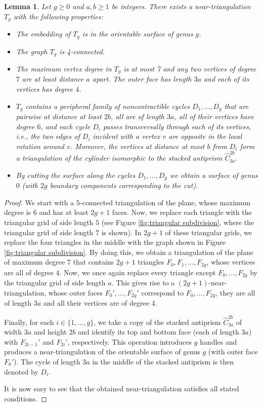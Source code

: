\documentclass[11pt]{article}
\newtheorem{lemma}[theorem]{Lemma}
\begin{document}
\begin{lemma}\label{lem:desired near-triangulation}
Let $g\ge0$ and $a,b\ge1$ be integers. There exists a near-triangulation $T_g$ with the following properties:
  \begin{itemize}
   \item[(1)] The embedding of $T_g$ is in the orientable surface of genus $g$.
   \item[(2)] The graph $T_g$ is 4-connected.
   \item[(3)] The maximum vertex degree in $T_g$ is at most 7 and any two vertices of degree $7$ are at least distance $a$ apart. The outer face has length $3a$ and each of its vertices has degree $4$. 
   \item[(4)] $T_g$ contains a peripheral family of noncontractible cycles $D_1,\dots,D_g$ that are pairwise at distance at least $2b$, all are of length $3a$, all of their vertices have degree $6$, and each cycle $D_i$ passes transversally through each of its vertices, i.e., the two edges of $D_i$ incident with a vertex $v$ are opposite in the local rotation around $v$. Moreover, the vertices at distance at most $b$ from $D_i$ form a triangulation of the cylinder isomorphic to the stacked antiprism $\widehat{C}_{3a}^{2b}$. 
   \item[(5)] By cutting the surface along the cycles $D_1,\dots,D_g$ we obtain a surface of genus $0$ (with $2g$ boundary components corresponding to the cut). 
  \end{itemize}
\end{lemma}

\begin{proof}
  We start with a $5$-connected triangulation of the plane, whose maximum degree is 6 and has at least $2g+1$ faces. Now, we replace each triangle with the triangular grid of side length $5$ (see Figure \ref{fig:triangular subdivision}, where the triangular grid of side length $7$ is shown). In $2g+1$ of these triangular grids, we replace the four triangles in the middle with the graph shown in Figure \ref{fig:triangular subdivision}. By doing this, we obtain a triangulation of the plane of maximum degree 7 that contains $2g+1$ triangles $F_0,F_1,\dots,F_{2g}$, whose vertices are all of degree 4. Now, we once again replace every triangle except $F_0,\dots,F_{2g}$ by the triangular grid of side length $a$. This gives rise to a $(2g+1)$-near-triangulation, whose outer faces $F_0',\dots,F_{2g}'$ correspond to $F_0,\dots,F_{2g}$, they are all of length $3a$ and all their vertices are of degree 4.
  
  Finally, for each $i\in \{1,\dots,g\}$, we take a copy of the stacked antiprism $\widehat{C}_{3a}^{2b}$ of width $3a$ and height $2b$ and identify its top and bottom face (each of length $3a$) with $F_{2i-1}'$ and $F_{2i}'$, respectively. This operation introduces $g$ handles and produces a near-triangulation of the orientable surface of genus $g$ (with outer face $F_0'$). The cycle of length $3a$ in the middle of the stacked antiprism is then denoted by $D_i$. 
  
  It is now easy to see that the obtained near-triangulation satisfies all stated conditions.
\end{proof}
\end{document}
